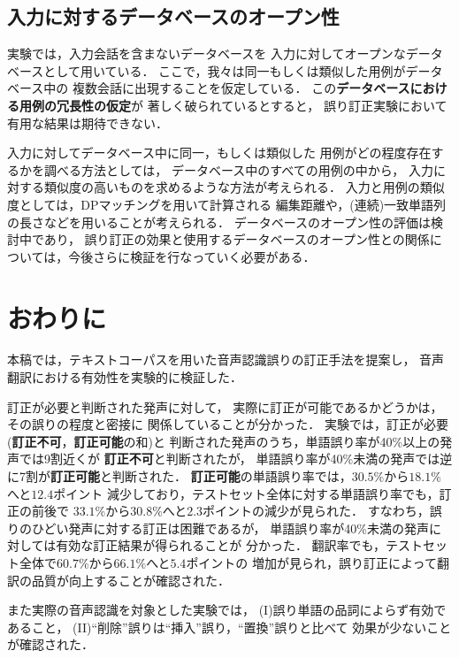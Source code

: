 \subsection{入力に対するデータベースのオープン性}

実験では，入力会話を含まないデータベースを
入力に対してオープンなデータベースとして用いている．
ここで，我々は同一もしくは類似した用例がデータベース中の
複数会話に出現することを仮定している．
この{\bf データベースにおける用例の冗長性の仮定}が
著しく破られているとすると，
誤り訂正実験において有用な結果は期待できない．

入力に対してデータベース中に同一，もしくは類似した
用例がどの程度存在するかを調べる方法としては，
データベース中のすべての用例の中から，
入力に対する類似度の高いものを求めるような方法が考えられる．
入力と用例の類似度としては，DPマッチングを用いて計算される
編集距離や，(連続)一致単語列の長さなどを用いることが考えられる．
データベースのオープン性の評価は検討中であり，
誤り訂正の効果と使用するデータベースのオープン性との関係に
ついては，今後さらに検証を行なっていく必要がある．



\section{おわりに}

本稿では，テキストコーパスを用いた音声認識誤りの訂正手法を提案し，
音声翻訳における有効性を実験的に検証した．

訂正が必要と判断された発声に対して，
実際に訂正が可能であるかどうかは，その誤りの程度と密接に
関係していることが分かった．
実験では，訂正が必要({\bf 訂正不可}，{\bf 訂正可能}の和)と
判断された発声のうち，単語誤り率が40\%以上の発声では9割近くが
{\bf 訂正不可}と判断されたが，
単語誤り率が40\%未満の発声では逆に7割が{\bf 訂正可能}と判断された．
{\bf 訂正可能}の単語誤り率では，$30.5\%$から$18.1\%$へと$12.4$ポイント
減少しており，テストセット全体に対する単語誤り率でも，訂正の前後で
$33.1\%$から$30.8\%$へと$2.3$ポイントの減少が見られた．
すなわち，誤りのひどい発声に対する訂正は困難であるが，
単語誤り率が40\%未満の発声に対しては有効な訂正結果が得られることが
分かった．
翻訳率でも，テストセット全体で$60.7\%$から$66.1\%$へと$5.4$ポイントの
増加が見られ，誤り訂正によって翻訳の品質が向上することが確認された．

また実際の音声認識を対象とした実験では，
(I)誤り単語の品詞によらず有効であること，
(II)``削除''誤りは``挿入''誤り，``置換''誤りと比べて
効果が少ないことが確認された．

